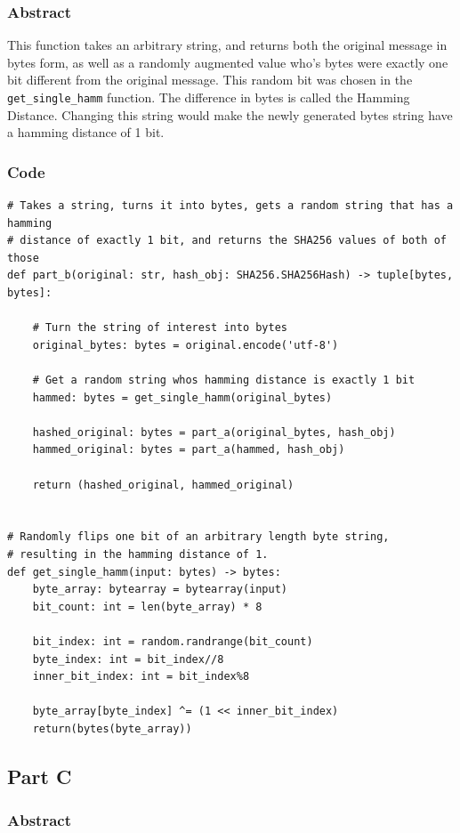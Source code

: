 \documentclass[11pt]{article}
\begin{document}
\subsubsection*{Abstract}

This function takes an arbitrary string, and returns both the original message in bytes form, as well as a randomly augmented value who's bytes were exactly one bit different from the original message. This random bit was chosen in the \verb|get_single_hamm| function. The difference in bytes is called the Hamming Distance. Changing this string would make the newly generated bytes string have a hamming distance of 1 bit. 

\subsubsection*{Code}

\begin{lstlisting}
# Takes a string, turns it into bytes, gets a random string that has a hamming
# distance of exactly 1 bit, and returns the SHA256 values of both of those
def part_b(original: str, hash_obj: SHA256.SHA256Hash) -> tuple[bytes, bytes]:

    # Turn the string of interest into bytes
    original_bytes: bytes = original.encode('utf-8')

    # Get a random string whos hamming distance is exactly 1 bit
    hammed: bytes = get_single_hamm(original_bytes)
    
    hashed_original: bytes = part_a(original_bytes, hash_obj)
    hammed_original: bytes = part_a(hammed, hash_obj)

    return (hashed_original, hammed_original)


# Randomly flips one bit of an arbitrary length byte string, 
# resulting in the hamming distance of 1.
def get_single_hamm(input: bytes) -> bytes:
    byte_array: bytearray = bytearray(input)
    bit_count: int = len(byte_array) * 8

    bit_index: int = random.randrange(bit_count)
    byte_index: int = bit_index//8
    inner_bit_index: int = bit_index%8

    byte_array[byte_index] ^= (1 << inner_bit_index)
    return(bytes(byte_array))
\end{lstlisting}

\subsection*{Part C}
\subsubsection*{Abstract}
\end{document}
